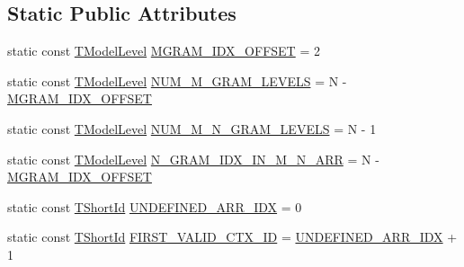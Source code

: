 \subsection*{Static Public Attributes}
\begin{DoxyCompactItemize}
\item 
static const \hyperlink{namespaceuva_1_1smt_1_1tries_a20577a44b3a42d26524250634379b7cb}{T\+Model\+Level} \hyperlink{classuva_1_1smt_1_1tries_1_1_a_trie_af0f7dbcf0e0685c7acf49fd71710d138}{M\+G\+R\+A\+M\+\_\+\+I\+D\+X\+\_\+\+O\+F\+F\+S\+E\+T} = 2
\item 
static const \hyperlink{namespaceuva_1_1smt_1_1tries_a20577a44b3a42d26524250634379b7cb}{T\+Model\+Level} \hyperlink{classuva_1_1smt_1_1tries_1_1_a_trie_a24132c9483caf8dba629feaed57f61cd}{N\+U\+M\+\_\+\+M\+\_\+\+G\+R\+A\+M\+\_\+\+L\+E\+V\+E\+L\+S} = N -\/ \hyperlink{classuva_1_1smt_1_1tries_1_1_a_trie_af0f7dbcf0e0685c7acf49fd71710d138}{M\+G\+R\+A\+M\+\_\+\+I\+D\+X\+\_\+\+O\+F\+F\+S\+E\+T}
\item 
static const \hyperlink{namespaceuva_1_1smt_1_1tries_a20577a44b3a42d26524250634379b7cb}{T\+Model\+Level} \hyperlink{classuva_1_1smt_1_1tries_1_1_a_trie_a79334a0fd7b506705033a5bbc2041186}{N\+U\+M\+\_\+\+M\+\_\+\+N\+\_\+\+G\+R\+A\+M\+\_\+\+L\+E\+V\+E\+L\+S} = N -\/ 1
\item 
static const \hyperlink{namespaceuva_1_1smt_1_1tries_a20577a44b3a42d26524250634379b7cb}{T\+Model\+Level} \hyperlink{classuva_1_1smt_1_1tries_1_1_a_trie_ab3fc31d42c7407059bf2b242d424dc7b}{N\+\_\+\+G\+R\+A\+M\+\_\+\+I\+D\+X\+\_\+\+I\+N\+\_\+\+M\+\_\+\+N\+\_\+\+A\+R\+R} = N -\/ \hyperlink{classuva_1_1smt_1_1tries_1_1_a_trie_af0f7dbcf0e0685c7acf49fd71710d138}{M\+G\+R\+A\+M\+\_\+\+I\+D\+X\+\_\+\+O\+F\+F\+S\+E\+T}
\item 
static const \hyperlink{namespaceuva_1_1smt_1_1hashing_adcf22e1982ad09d3a63494c006267469}{T\+Short\+Id} \hyperlink{classuva_1_1smt_1_1tries_1_1_a_trie_aac34cbc190b3d5a2d32720a189fe8e72}{U\+N\+D\+E\+F\+I\+N\+E\+D\+\_\+\+A\+R\+R\+\_\+\+I\+D\+X} = 0
\item 
static const \hyperlink{namespaceuva_1_1smt_1_1hashing_adcf22e1982ad09d3a63494c006267469}{T\+Short\+Id} \hyperlink{classuva_1_1smt_1_1tries_1_1_a_trie_a364b68d11ca94eb1b38d78035376da39}{F\+I\+R\+S\+T\+\_\+\+V\+A\+L\+I\+D\+\_\+\+C\+T\+X\+\_\+\+I\+D} = \hyperlink{classuva_1_1smt_1_1tries_1_1_a_trie_aac34cbc190b3d5a2d32720a189fe8e72}{U\+N\+D\+E\+F\+I\+N\+E\+D\+\_\+\+A\+R\+R\+\_\+\+I\+D\+X} + 1
\end{DoxyCompactItemize}
